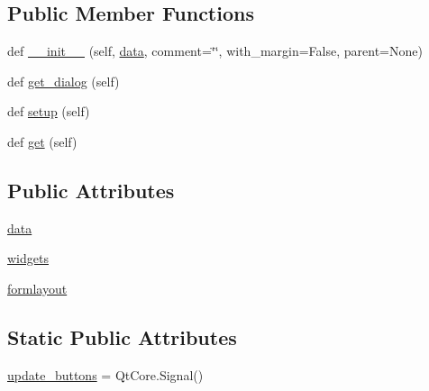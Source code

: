 \subsection*{Public Member Functions}
\begin{DoxyCompactItemize}
\item 
def \hyperlink{classmatplotlib_1_1backends_1_1qt__editor_1_1__formlayout_1_1FormWidget_a73966d57907faca29e1b43cf4d451619}{\+\_\+\+\_\+init\+\_\+\+\_\+} (self, \hyperlink{classmatplotlib_1_1backends_1_1qt__editor_1_1__formlayout_1_1FormWidget_ab1293e83fc7593ecb3b3351169a54d2b}{data}, comment=\char`\"{}\char`\"{}, with\+\_\+margin=False, parent=None)
\item 
def \hyperlink{classmatplotlib_1_1backends_1_1qt__editor_1_1__formlayout_1_1FormWidget_a2be9e90096f11105beb9077013580c41}{get\+\_\+dialog} (self)
\item 
def \hyperlink{classmatplotlib_1_1backends_1_1qt__editor_1_1__formlayout_1_1FormWidget_af390b127a219f2f31ba3fdaf6a8b6e60}{setup} (self)
\item 
def \hyperlink{classmatplotlib_1_1backends_1_1qt__editor_1_1__formlayout_1_1FormWidget_af53d62547745b63738fe2a7281cf83f8}{get} (self)
\end{DoxyCompactItemize}
\subsection*{Public Attributes}
\begin{DoxyCompactItemize}
\item 
\hyperlink{classmatplotlib_1_1backends_1_1qt__editor_1_1__formlayout_1_1FormWidget_ab1293e83fc7593ecb3b3351169a54d2b}{data}
\item 
\hyperlink{classmatplotlib_1_1backends_1_1qt__editor_1_1__formlayout_1_1FormWidget_ac1bc4cf16f88cd59a67b160516ba3098}{widgets}
\item 
\hyperlink{classmatplotlib_1_1backends_1_1qt__editor_1_1__formlayout_1_1FormWidget_a9d66c98d5ae50b29257e9b8adefc3040}{formlayout}
\end{DoxyCompactItemize}
\subsection*{Static Public Attributes}
\begin{DoxyCompactItemize}
\item 
\hyperlink{classmatplotlib_1_1backends_1_1qt__editor_1_1__formlayout_1_1FormWidget_adfefe65e31d52d66ec993005e8512b2c}{update\+\_\+buttons} = Qt\+Core.\+Signal()
\end{DoxyCompactItemize}


